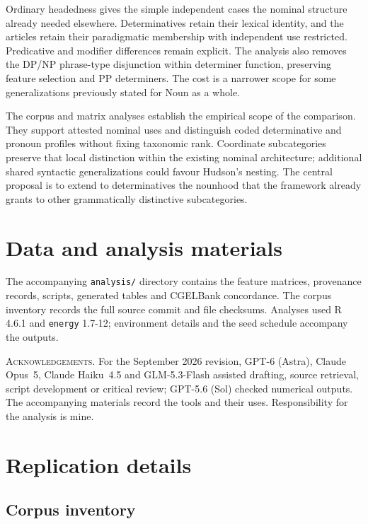 \documentclass[12pt]{article}
\begin{document}
Ordinary headedness gives the simple independent cases the nominal structure already needed elsewhere. Determinatives retain their lexical identity, and the articles retain their paradigmatic membership with independent use restricted. Predicative and modifier differences remain explicit. The analysis also removes the DP/NP phrase-type disjunction within determiner function, preserving feature selection and PP determiners. The cost is a narrower scope for some generalizations previously stated for Noun as a whole.

The corpus and matrix analyses establish the empirical scope of the comparison. They support attested nominal uses and distinguish coded determinative and pronoun profiles without fixing taxonomic rank. Coordinate subcategories preserve that local distinction within the existing nominal architecture; additional shared syntactic generalizations could favour Hudson's nesting. The central proposal is to extend to determinatives the nounhood that the framework already grants to other grammatically distinctive subcategories.

\section*{Data and analysis materials}

The accompanying \texttt{analysis/} directory contains the feature matrices, provenance records, scripts, generated tables and CGELBank concordance. The corpus inventory records the full source commit and file checksums. Analyses used R 4.6.1 and \texttt{energy} 1.7-12; environment details and the seed schedule accompany the outputs.

\vspace{0.5\baselineskip}
\noindent\textsc{Acknowledgements.} For the September 2026 revision, GPT-6 (Astra), Claude Opus~5, Claude Haiku~4.5 and GLM-5.3-Flash assisted drafting, source retrieval, script development or critical review; GPT-5.6 (Sol) checked numerical outputs. The accompanying materials record the tools and their uses. Responsibility for the analysis is mine.

\appendix
\section{Replication details}\label{app:replication}

\subsection{Corpus inventory}
\end{document}
